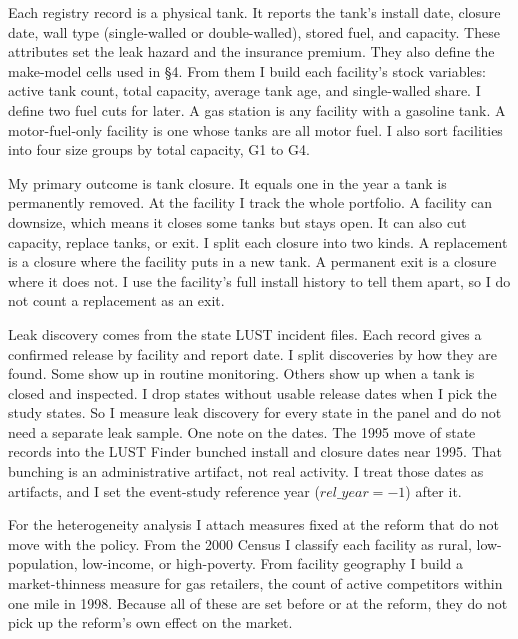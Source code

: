\documentclass[
  12pt,
]{article}
\begin{document}
Each registry record is a physical tank. It reports the tank's install
date, closure date, wall type (single-walled or double-walled), stored
fuel, and capacity. These attributes set the leak hazard and the
insurance premium. They also define the make-model cells used in §4.
From them I build each facility's stock variables: active tank count,
total capacity, average tank age, and single-walled share. I define two
fuel cuts for later. A gas station is any facility with a gasoline tank.
A motor-fuel-only facility is one whose tanks are all motor fuel. I also
sort facilities into four size groups by total capacity, G1 to G4.

My primary outcome is tank closure. It equals one in the year a tank is
permanently removed. At the facility I track the whole portfolio. A
facility can downsize, which means it closes some tanks but stays open.
It can also cut capacity, replace tanks, or exit. I split each closure
into two kinds. A replacement is a closure where the facility puts in a
new tank. A permanent exit is a closure where it does not. I use the
facility's full install history to tell them apart, so I do not count a
replacement as an exit.

Leak discovery comes from the state LUST incident files. Each record
gives a confirmed release by facility and report date. I split
discoveries by how they are found. Some show up in routine monitoring.
Others show up when a tank is closed and inspected. I drop states
without usable release dates when I pick the study states. So I measure
leak discovery for every state in the panel and do not need a separate
leak sample. One note on the dates. The 1995 move of state records into
the LUST Finder bunched install and closure dates near 1995. That
bunching is an administrative artifact, not real activity. I treat those
dates as artifacts, and I set the event-study reference year
(\(rel\_year = -1\)) after it.

For the heterogeneity analysis I attach measures fixed at the reform
that do not move with the policy. From the 2000 Census I classify each
facility as rural, low-population, low-income, or high-poverty. From
facility geography I build a market-thinness measure for gas retailers,
the count of active competitors within one mile in 1998. Because all of
these are set before or at the reform, they do not pick up the reform's
own effect on the market.
\end{document}
